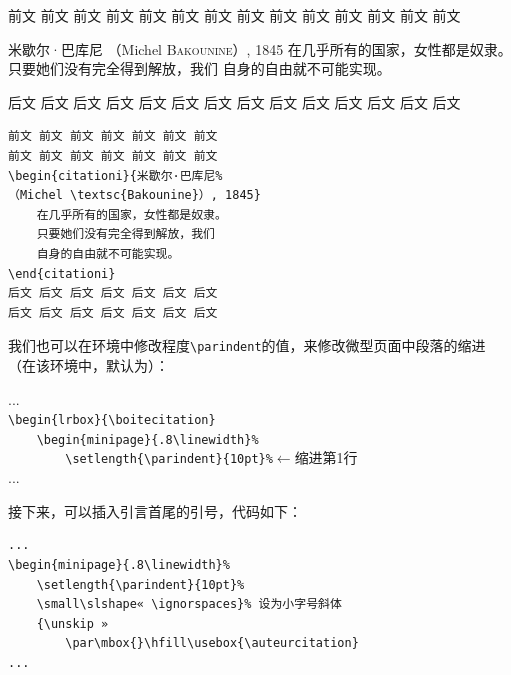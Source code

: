 \begin{codelist}[11.13]{
前文 前文 前文 前文 前文 前文 前文
前文 前文 前文 前文 前文 前文 前文
\begin{citationi}{米歇尔·巴库尼%
    （Michel \textsc{Bakounine}）, 1845}
    在几乎所有的国家，女性都是奴隶。
    只要她们没有完全得到解放，我们
    自身的自由就不可能实现。
\end{citationi}
后文 后文 后文 后文 后文 后文 后文
后文 后文 后文 后文 后文 后文 后文

}\begin{verbatim}
前文 前文 前文 前文 前文 前文 前文
前文 前文 前文 前文 前文 前文 前文
\begin{citationi}{米歇尔·巴库尼%
（Michel \textsc{Bakounine}）, 1845}
    在几乎所有的国家，女性都是奴隶。
    只要她们没有完全得到解放，我们
    自身的自由就不可能实现。
\end{citationi}
后文 后文 后文 后文 后文 后文 后文
后文 后文 后文 后文 后文 后文 后文
\end{verbatim}
\end{codelist}

我们也可以在环境中修改程度\verb|\parindent|的值，来修改微型页面中段落的缩进（在该环境中，默认为\dm{0pt}）：

\begin{dmd}
...\\
\verb|\begin{lrbox}{\boitecitation}|\\
\verb|    \begin{minipage}{.8\linewidth}%|\\
\verb|        \setlength{\parindent}{10pt}%|\quad $\leftarrow$\textsf{缩进第1行}\\
...
\end{dmd}

接下来，可以插入引言首尾的引号，代码如下：

\begin{dmd}
\begin{verbatim}
... 
\begin{minipage}{.8\linewidth}%
    \setlength{\parindent}{10pt}%
    \small\slshape« \ignorspaces}% 设为小字号斜体
    {\unskip »
        \par\mbox{}\hfill\usebox{\auteurcitation}
...
\end{verbatim}
\end{dmd}

